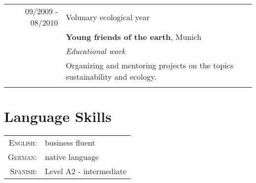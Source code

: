 \documentclass[a4paper,10pt]{article} %
\begin{document}
\begin{tabular}{r|p{11cm}}
 
 
\textsc{09/2009 - 08/2010} & Volunary ecological year\\
                           & \textbf{Young friends of the earth}, Munich\\
                           & \emph{Educational work}\\
                           & \small{Organizing and mentoring projects on the topics sustainability and ecology.}\\
\multicolumn{2}{c}{} \\
 
\end{tabular}
 
 
 
 
 
 
\section{Language Skills}
 
\begin{tabular}{rl}
\textsc{English:} & business fluent\\
 
\textsc{German:} & native language\\
 
\textsc{Spanish:} & Level A2 - intermediate \\
\end{tabular}
 
\end{document}
